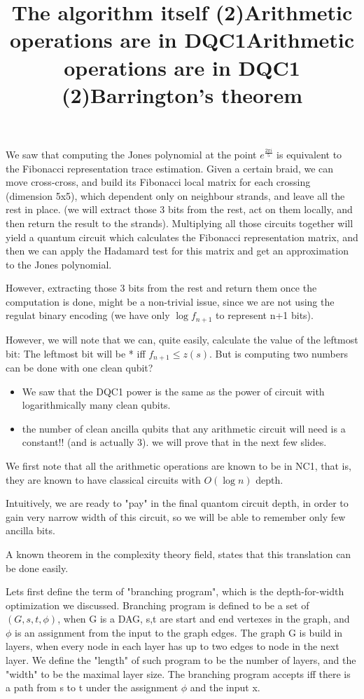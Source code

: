 \documentclass{article}
\begin{document}
{We saw that computing the Jones polynomial at the point $e^{\frac{2{\pi}i}{5}}$ is equivalent to the Fibonacci representation trace estimation.
Given a certain braid, we can move cross-cross, and build its Fibonacci local matrix for each crossing (dimension 5x5), which dependent only on  neighbour strands, and leave all the rest in place. (we will extract those 3 bits from the rest, act on them locally, and then return the result to the strands). Multiplying all those circuits together will yield a quantum circuit which calculates the Fibonacci representation matrix, and then we can apply the Hadamard test for this matrix and get an approximation to the Jones polynomial.


\title{The algorithm itself (2)}
However, extracting those 3 bits from the rest and return them once the computation is done, might be a non-trivial issue, since we are not using the regulat binary encoding (we have only $\log{f_{n+1}}$ to represent n+1 bits). 

However, we will note that we can, quite easily, calculate the value of the leftmost bit: The leftmost bit will be * iff $f_{n+1} \leq z(s)$. But is computing two numbers can be done with one clean qubit?


\title{Arithmetic operations are in DQC1}
\begin{itemize}
\item We saw that the DQC1 power is the same as the power of circuit with logarithmically many clean qubits. 

\item the number of clean ancilla qubits that any arithmetic circuit will need is a constant!! (and is actually 3). we will prove that in the next few slides. 
\end{itemize}



\title{Arithmetic operations are in DQC1 (2)}
We first note that all the arithmetic operations are known to be in NC1, that is, they are known to have classical circuits with $O(\log{n})$ depth.

Intuitively, we are ready to "pay" in the final quantom circuit depth, in order to gain very narrow width of this circuit, so we will be able to remember only few ancilla bits.

A known theorem in the complexity theory field, states that this translation can be done easily. 



\title{Barrington's theorem}
Lets first define the term of "branching program", which is the depth-for-width optimization we discussed. Branching program is defined to be a set of $(G,s,t,\phi)$, when G is a DAG, s,t are start and end vertexes in the graph, and $\phi$ is an assignment from the input to the graph edges. The graph G is build in layers, when every node in each layer has up to two edges to node in the next layer. We define the "length" of such program to be the number of layers, and the "width" to be the maximal layer size. The branching program accepts iff there is a path from s to t under the assignment $\phi$ and the input x. 


}
\end{document}
